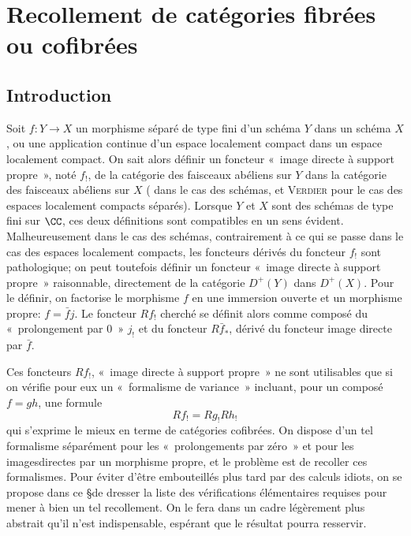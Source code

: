 \documentclass[10pt]{../fichiers-configuration-latex/smfart}
\begin{document}
\section{Recollement de catégories fibrées ou
  cofibrées}\pageoriginale

\subsection{Introduction}

Soit $f:Y\rightarrow X$ un morphisme séparé de type fini d'un schéma
$Y$ dans un schéma $X$, ou une application continue d'un espace
localement compact dans un espace localement compact. On sait alors
définir un foncteur « image directe à support propre », noté
$f_{!}$, de la catégorie des faisceaux abéliens sur $Y$ dans la
catégorie des faisceaux abéliens sur $X$ (\cf {} dans le cas des
schémas, et \textsc{Verdier} \cite{SGA4-17:V3} pour le cas des espaces localement compacts
séparés). Lorsque $Y$ et $X$ sont des schémas de type fini sur
$\CC$, ces deux définitions sont compatibles en un sens
évident. Malheureusement dans le cas des schémas, contrairement à ce
qui se passe dans le cas des espaces localement compacts, les
foncteurs dérivés du foncteur $f_{!}$ sont pathologique; on peut
toutefois définir un foncteur « image directe à support propre »
raisonnable, directement de la catégorie $D^{+}(Y)$ dans
$D^{+}(X)$. Pour le définir, on factorise le morphisme $f$ en une
immersion ouverte et un morphisme propre: $f=\bar{f}j$. Le foncteur
$Rf_{!}$ cherché se définit alors comme composé du « prolongement
par $0$ »  $j_{!}$ et du foncteur $R\bar{f}_{\ast}$, dérivé du
foncteur image directe par $\bar{f}$.

Ces foncteurs $Rf_{!}$, « image directe à support propre »  ne
sont utilisables que si on vérifie pour eux un « formalisme de
variance »  incluant, pour un composé $f=gh$, une formule
\[
Rf_{!}=Rg_{!} Rh_{!}
\]
qui s'exprime le mieux en terme de catégories cofibrées. On dispose
d'un tel formalisme séparément pour les « prolongements par
zéro » et pour les images\pageoriginale directes par un morphisme
propre, et le problème est de recoller ces formalismes. Pour éviter
d'être embouteillés plus tard par des calculs idiots, on se propose
dans ce \S de dresser la liste des vérifications élémentaires requises
pour mener à bien un tel recollement. On le fera dans un cadre
légèrement plus abstrait qu'il n'est indispensable, espérant que le
résultat pourra resservir.
\end{document}
